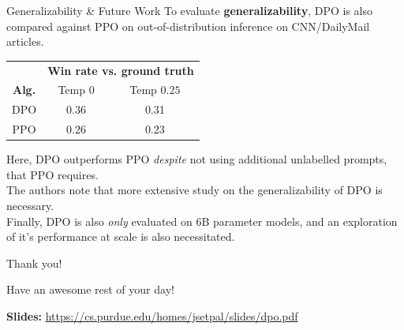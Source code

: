 \documentclass{beamer}
\begin{document}
\begin{frame}{Generalizability \& Future Work}
	To evaluate \textbf{generalizability}, DPO is also compared against PPO on out-of-distribution inference on CNN/DailyMail articles.
	\begin{table}
		\begin{tabular}{ccc}
			\toprule
			& \multicolumn{2}{c}{\textbf{Win rate vs. ground truth}} \\
			\cmidrule(lr){2-3}
			\textbf{Alg.} & Temp $0$ & Temp $0.25$ \\
			\midrule
			DPO & 0.36 & 0.31 \\
			PPO & 0.26 & 0.23 \\
			\bottomrule
		\end{tabular}
	\end{table}

	Here, DPO outperforms PPO \textit{despite} not using additional unlabelled prompts, that PPO requires.
	\pause \newline \\

	The authors note that more extensive study on the generalizability of DPO is necessary. \pause \newline \\

	Finally, DPO is also \textit{only} evaluated on 6B parameter models, and an exploration of it's performance at scale is also necessitated.
\end{frame}

\begin{frame}{Thank you!}
	\begin{center}
		Have an awesome rest of your day!
	\end{center}
	\begin{center}
		\textbf{Slides:} \url{https://cs.purdue.edu/homes/jsetpal/slides/dpo.pdf}
	\end{center}
\end{frame}
\end{document}
